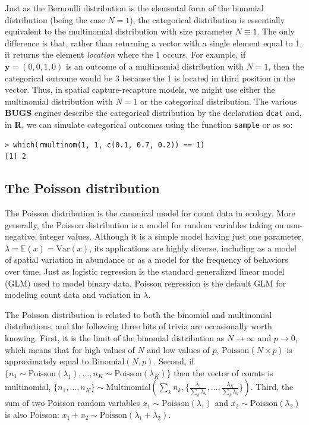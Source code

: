 Just as the Bernoulli distribution is the elemental form of the
binomial distribution (being the case $N=1$), the
categorical distribution is essentially equivalent to
the multinomial distribution with size parameter
$N\equiv1$. The only difference is that, rather than returning a
vector with a single element equal to 1, it returns the element {\it location}
where the 1 occurs. For example, if $\mathbf{y}=(0,0,1,0)$ is an outcome of a
multinomial distribution with $N=1$, then the categorical outcome
would be 3 because the 1 is located in third position in the vector. Thus, in spatial
capture-recapture models, we might use either the multinomial
distribution with $N=1$ or the categorical distribution.
The various {\bf BUGS} engines describe the categorical distribution
by the declaration \mbox{\tt dcat} and, in {\bf R}, we can simulate
categorical outcomes using the function \mbox{\tt sample} or as so:
\begin{verbatim}
> which(rmultinom(1, 1, c(0.1, 0.7, 0.2)) == 1)
[1] 2
\end{verbatim}


\subsection{The Poisson distribution}


The Poisson distribution is the canonical model for count data in
ecology.  More generally, the
Poisson distribution is a model for random variables taking on
non-negative, integer values.  Although it is a simple model having just one
parameter, $\lambda = \mathbb{E}(x) = \text{Var}(x)$, its applications
are highly diverse, including
as a model of spatial variation in abundance or as a model for the
frequency of behaviors over time.  Just as logistic regression is the
standard generalized linear model (GLM) used to model binary data, Poisson
regression is the default GLM for modeling count data and variation in
$\lambda$.

The Poisson distribution is related to
both the binomial and multinomial distributions, and the following three
bits of trivia are occasionally worth knowing. First, it is the limit of the binomial
distribution as $N \to \infty$ and $p \to 0$, which means that for
high values of $N$ and low values
of $p$, $\text{Poisson}(N\times p)$ is approximately equal to $\text{Binomial}(N,
p)$. Second, if $\{n_1 \sim \text{Poisson}(\lambda_1),
\dots, n_K \sim \text{Poisson}(\lambda_K)\}$
then the vector of counts is multinomial, $\{n_1, \dots, n_K\}
\sim \text{Multinomial}(\sum_k n_k, \{\frac{\lambda_1}{\sum_k \lambda_k},
\dots, \frac{\lambda_K}{\sum_k \lambda_k}\})$. Third, the sum of two
Poisson random variables $x_1 \sim \mbox{Poisson}(\lambda_1)$ and $x_2
\sim \mbox{Poisson}(\lambda_2)$ is also Poisson: $x_1+x_2 \sim
\mbox{Poisson}(\lambda_1+\lambda_2)$.

